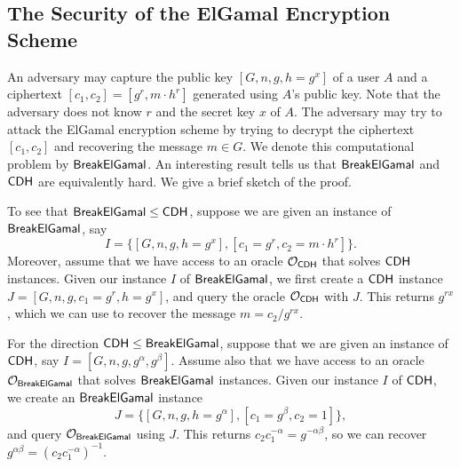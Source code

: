 \subsection{The Security of the ElGamal Encryption Scheme}
An adversary may capture the public key $[G, n, g, h = g^x]$ of a user $A$ 
and a ciphertext $[c_1, c_2] = [g^r, m \cdot h^r]$ generated using $A$'s public 
key. Note that the adversary does not know $r$ and the secret key $x$ of $A$. 
The adversary may try to attack the ElGamal encryption scheme by trying to 
decrypt the ciphertext $[c_1, c_2]$ and recovering the message $m \in G$. 
We denote this computational problem by ${\sf BreakElGamal}$. An interesting 
result tells us that ${\sf BreakElGamal}$ and ${\sf CDH}$ are equivalently hard. 
We give a brief sketch of the proof. 

To see that ${\sf BreakElGamal} \leq {\sf CDH}$, suppose we are given an instance 
of ${\sf BreakElGamal}$, say 
\[ I = \{[G, n, g, h = g^x], [c_1 = g^r, c_2 = m \cdot h^r]\}. \] 
Moreover, assume that we have access to an oracle ${\cal O}_{{\sf CDH}}$ that solves 
${\sf CDH}$ instances. Given our instance $I$ of ${\sf BreakElGamal}$, we first create 
a ${\sf CDH}$ instance $J = [G, n, g, c_1 = g^r, h = g^x]$, and query the 
oracle ${\cal O}_{{\sf CDH}}$ with $J$. This returns $g^{rx}$, which we can use 
to recover the message $m = c_2/g^{rx}$. 

For the direction ${\sf CDH} \leq {\sf BreakElGamal}$, suppose that we are given an 
instance of ${\sf CDH}$, say $I = [G, n, g, g^\alpha, g^\beta]$. Assume also that 
we have access to an oracle ${\cal O}_{{\sf BreakElGamal}}$ that solves 
${\sf BreakElGamal}$ instances. Given our instance $I$ of ${\sf CDH}$, we create an 
${\sf BreakElGamal}$ instance 
\[ J = \{[G, n, g, h = g^\alpha], [c_1 = g^\beta, c_2 = 1]\}, \] 
and query ${\cal O}_{{\sf BreakElGamal}}$ using $J$. This returns $c_2c_1^{-\alpha} 
= g^{-\alpha\beta}$, so we can recover $g^{\alpha\beta} = (c_2c_1^{-\alpha})^{-1}$. 